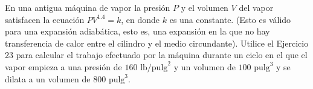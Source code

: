 \item En una antigua máquina de vapor la presión $P$ y el volumen $V$ del vapor satisfacen la ecuación $PV^{1.4} = k$, en donde $k$ es una constante. (Esto es válido para una expansión adiabática, esto es, una expansión en la que no hay transferencia de calor entre el cilindro y el medio circundante). Utilice el Ejercicio 23 para calcular el trabajo efectuado por la máquina durante un ciclo en el que el vapor empieza a una presión de $160 \text{ lb/pulg}^2$ y un volumen de $100 \text{ pulg}^3$ y se dilata a un volumen de $800 \text{ pulg}^3$.
